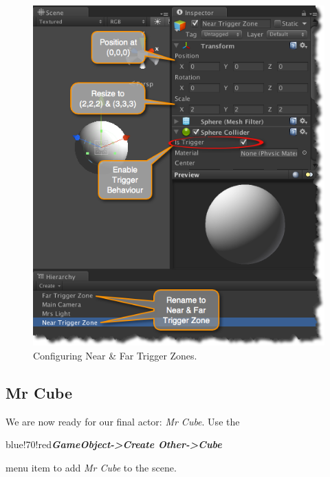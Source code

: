 \begin{figure}[htbp]
\centering
\includegraphics[keepaspectratio,width=\textwidth,height=0.75\textheight]{config-trigger-zones.png}
\caption{Configuring Near \& Far Trigger Zones.}
\label{config-trigger-zones.png}
\end{figure}

\subsection{Mr Cube}
\label{mrcube}

We are now ready for our final actor: \emph{Mr Cube}. Use the \begin{color}{blue!70!red}\emph{\textbf{GameObject->Create Other->Cube}}\end{color} menu item to add \emph{Mr Cube} to the scene.

